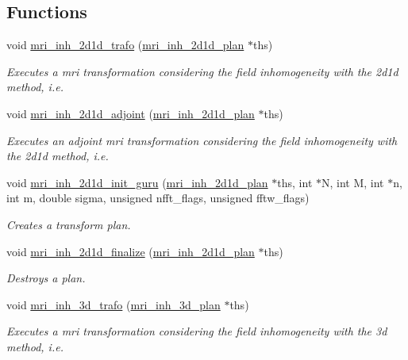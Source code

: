 \subsection*{Functions}
\begin{CompactItemize}
\item 
void \hyperlink{group__mri_ga0}{mri\_\-inh\_\-2d1d\_\-trafo} (\hyperlink{structmri__inh__2d1d__plan}{mri\_\-inh\_\-2d1d\_\-plan} $\ast$ths)
\begin{CompactList}\small\item\em Executes a mri transformation considering the field inhomogeneity with the 2d1d method, i.e. \item\end{CompactList}\item 
void \hyperlink{group__mri_ga1}{mri\_\-inh\_\-2d1d\_\-adjoint} (\hyperlink{structmri__inh__2d1d__plan}{mri\_\-inh\_\-2d1d\_\-plan} $\ast$ths)
\begin{CompactList}\small\item\em Executes an adjoint mri transformation considering the field inhomogeneity with the 2d1d method, i.e. \item\end{CompactList}\item 
void \hyperlink{group__mri_ga2}{mri\_\-inh\_\-2d1d\_\-init\_\-guru} (\hyperlink{structmri__inh__2d1d__plan}{mri\_\-inh\_\-2d1d\_\-plan} $\ast$ths, int $\ast$N, int M, int $\ast$n, int m, double sigma, unsigned nfft\_\-flags, unsigned fftw\_\-flags)
\begin{CompactList}\small\item\em Creates a transform plan. \item\end{CompactList}\item 
void \hyperlink{group__mri_ga3}{mri\_\-inh\_\-2d1d\_\-finalize} (\hyperlink{structmri__inh__2d1d__plan}{mri\_\-inh\_\-2d1d\_\-plan} $\ast$ths)
\begin{CompactList}\small\item\em Destroys a plan. \item\end{CompactList}\item 
void \hyperlink{group__mri_ga4}{mri\_\-inh\_\-3d\_\-trafo} (\hyperlink{structmri__inh__3d__plan}{mri\_\-inh\_\-3d\_\-plan} $\ast$ths)
\begin{CompactList}\small\item\em Executes a mri transformation considering the field inhomogeneity with the 3d method, i.e. \item\end{CompactList}\item 

\end{CompactItemize}

